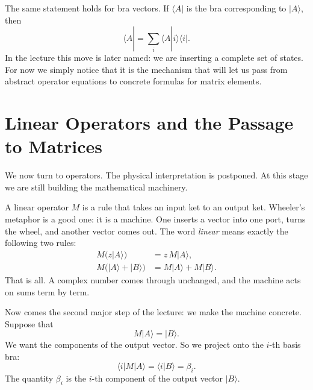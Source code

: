 The same statement holds for bra vectors. If \(\langle A|\) is the bra corresponding to \(|A\rangle\), then
\begin{equation}
\langle A|=\sum_i \langle A|i\rangle \langle i|.
\end{equation}
In the lecture this move is later named: we are inserting a complete set of states. For now we simply notice that it is the mechanism that will let us pass from abstract operator equations to concrete formulas for matrix elements.

\section{Linear Operators and the Passage to Matrices}

We now turn to operators. The physical interpretation is postponed. At this stage we are still building the mathematical machinery.

A linear operator \(M\) is a rule that takes an input ket to an output ket. Wheeler's metaphor is a good one: it is a machine. One inserts a vector into one port, turns the wheel, and another vector comes out. The word \emph{linear} means exactly the following two rules:
\begin{align}
M\bigl(z|A\rangle\bigr) &= z\,M|A\rangle, \\
M\bigl(|A\rangle+|B\rangle\bigr) &= M|A\rangle+M|B\rangle.
\end{align}
That is all. A complex number comes through unchanged, and the machine acts on sums term by term.

Now comes the second major step of the lecture: we make the machine concrete. Suppose that
\begin{equation}
M|A\rangle=|B\rangle.
\end{equation}
We want the components of the output vector. So we project onto the \(i\)-th basis bra:
\begin{equation}
\langle i|M|A\rangle=\langle i|B\rangle=\beta_i.
\end{equation}
The quantity \(\beta_i\) is the \(i\)-th component of the output vector \(|B\rangle\).


